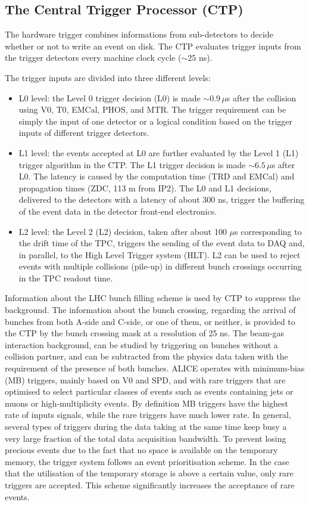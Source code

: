 \subsection{The Central Trigger Processor (CTP)}
\label{sec:CTP}
The hardware trigger combines informations from sub-detectors to decide whether or 
not to write an event on disk. The CTP evaluates trigger inputs from the trigger detectors every machine clock cycle ($\sim25$ ns). 

The trigger inputs are divided into three different levels:
\begin{itemize}
\item L0 level: the Level 0 trigger decision (L0) is made $\sim 0.9\, \mu$s after the 
collision using V0, T0, EMCal, PHOS, and MTR. The trigger requirement can be 
simply the input of one detector or a logical condition based on the trigger 
inputs of different trigger detectors.
\item L1 level: the events accepted at L0 are further evaluated by the Level 1 (L1) 
trigger algorithm in the CTP. The L1 trigger decision is made $\sim 6.5\, \mu$s after L0. 
The latency is caused by the computation time (TRD and EMCal) and propagation times 
(ZDC, 113 m from IP2). The L0 and L1 decisions, delivered to the detectors with a 
latency of about 300 ns, trigger the buffering of the event data in the detector front-end electronics. 
\item L2 level: the Level 2 (L2) decision, taken after about 100 $\mu$s corresponding to the 
drift time of the TPC, triggers the sending of the event data to DAQ and, in parallel, to the High Level Trigger system (HLT). 
L2 can be used to reject events with multiple collisions (pile-up) in different bunch crossings occurring
in the TPC readout time.
\end{itemize}
Information about the LHC bunch filling scheme is used by CTP to suppress the background. 
The information about the bunch crossing, regarding the arrival of bunches from both A-side and C-side,
or one of them, or neither, is provided to the CTP by the bunch crossing mask at a resolution of 25 ns. 
The beam-gas interaction background, can be studied by triggering on bunches without a collision partner, and can be 
subtracted from the physics data taken with the requirement of the presence of both bunches.
ALICE operates with minimum-bias (MB) triggers, mainly based on V0 and SPD, 
and with rare triggers that are optimised to select particular classes of events such as 
events containing jets or muons or high-multiplicity events. By definition MB triggers 
have the highest rate of inputs signals, while the rare triggers have much lower rate. 
In general, several types of triggers during the data taking at the same time keep busy a 
very large fraction of the total data acquisition bandwidth. To prevent losing precious events due to the fact that no 
space is available on the temporary memory, the trigger system follows an event prioritisation scheme. 
In the case that the utilisation of the temporary storage is above a certain 
value, only rare triggers are accepted. This scheme significantly increases the acceptance of rare events.

